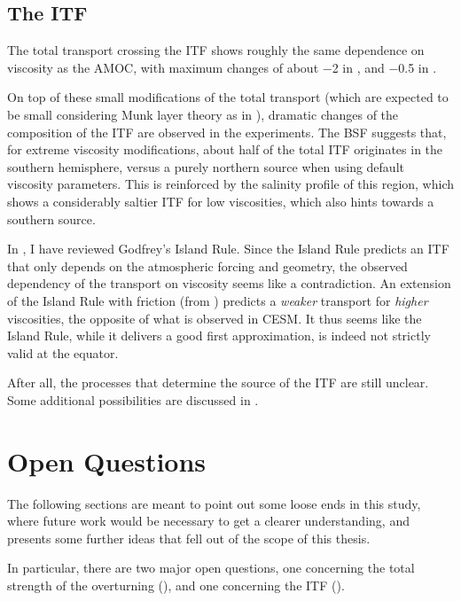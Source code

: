 \subsection{The \acl{ITF}}
\label{sec:outro-itf}
The total transport crossing the \ac{ITF} shows roughly the same dependence on viscosity as the \ac{AMOC}, with maximum changes of about \SI{-2}{\sv} in , and \SI{-0.5}{\sv} in .

On top of these small modifications of the total transport (which are expected to be small considering Munk layer theory as in ), dramatic changes of the composition of the \ac{ITF} are observed in the  experiments. The \ac{BSF} suggests that, for extreme viscosity modifications, about half of the total \ac{ITF} originates in the southern hemisphere, versus a purely northern source when using default viscosity parameters. This is reinforced by the salinity profile of this region, which shows a considerably saltier \ac{ITF} for low viscosities, which also hints towards a southern source.

In , I have reviewed Godfrey's Island Rule. Since the Island Rule predicts an \ac{ITF} that only depends on the atmospheric forcing and geometry, the observed dependency of the transport on viscosity seems like a contradiction. An extension of the Island Rule with friction (from \cite{wajsowicz}) predicts a \emph{weaker} transport for \emph{higher} viscosities, \ie the opposite of what is observed in \ac{CESM}. It thus seems like the Island Rule, while it delivers a good first approximation, is indeed not strictly valid at the equator.

After all, the processes that determine the source of the \ac{ITF} are still unclear. Some additional possibilities are discussed in .

\section{Open Questions}
\label{sec:outro-outlook}
The following sections are meant to point out some loose ends in this study, where future work would be necessary to get a clearer understanding, and presents some further ideas that fell out of the scope of this thesis.

In particular, there are two major open questions, one concerning the total strength of the overturning (), and one concerning the \ac{ITF} ().

